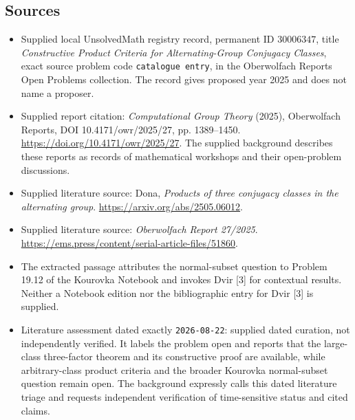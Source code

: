 \documentclass[11pt]{article}
\begin{document}
\subsection{Sources}
\begin{itemize}
\item Supplied local UnsolvedMath registry record, permanent ID \(30006347\), title \emph{Constructive Product Criteria for Alternating-Group Conjugacy Classes}, exact source problem code \texttt{catalogue entry}, in the Oberwolfach Reports Open Problems collection. The record gives proposed year 2025 and does not name a proposer.
\item Supplied report citation: \emph{Computational Group Theory} (2025), Oberwolfach Reports, DOI 10.4171/owr/2025/27, pp. 1389--1450. \url{https://doi.org/10.4171/owr/2025/27}. The supplied background describes these reports as records of mathematical workshops and their open-problem discussions.
\item Supplied literature source: Dona, \emph{Products of three conjugacy classes in the alternating group}. \url{https://arxiv.org/abs/2505.06012}.
\item Supplied literature source: \emph{Oberwolfach Report 27/2025}. \url{https://ems.press/content/serial-article-files/51860}.
\item The extracted passage attributes the normal-subset question to Problem 19.12 of the Kourovka Notebook and invokes Dvir [3] for contextual results. Neither a Notebook edition nor the bibliographic entry for Dvir [3] is supplied.
\item Literature assessment dated exactly \texttt{2026-08-22}: supplied dated curation, not independently verified. It labels the problem open and reports that the large-class three-factor theorem and its constructive proof are available, while arbitrary-class product criteria and the broader Kourovka normal-subset question remain open. The background expressly calls this dated literature triage and requests independent verification of time-sensitive status and cited claims.
\end{itemize}
\end{document}
